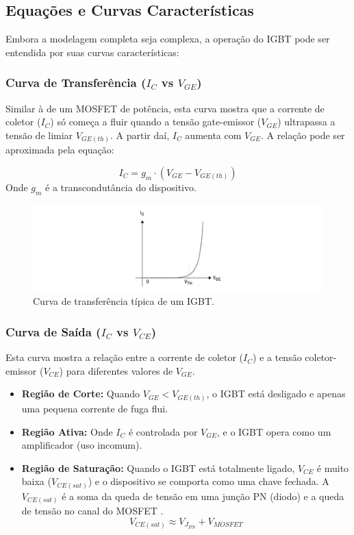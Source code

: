 \documentclass[12pt]{article}
\begin{document}
        \subsection{Equações e Curvas Características}

        Embora a modelagem completa seja complexa, a operação do IGBT pode ser entendida por suas curvas características:

        \subsubsection{Curva de Transferência ($I_C$ vs $V_{GE}$)}
        Similar à de um MOSFET de potência, esta curva mostra que a corrente de coletor ($I_C$) só começa a fluir quando a tensão gate-emissor ($V_{GE}$) ultrapassa a tensão de limiar $V_{GE(th)}$. A partir daí, $I_C$ aumenta com $V_{GE}$. A relação pode ser aproximada pela equação:

        \[
        I_C = g_m \cdot (V_{GE} - V_{GE(th)})
        \]
        Onde $g_m$ é a transcondutância do dispositivo.

        \begin{figure}[!h]
            \centering
            \includegraphics[width=0.6\linewidth]{images/curva_de_transferencia.png}
            \caption{Curva de transferência típica de um IGBT.}
            \label{fig:igbt_transfer}
        \end{figure}


        \subsubsection{\texorpdfstring{Curva de Saída ($I_C$ vs $V_{CE}$)}{Curva de Saída (IC vs VCE)}} Esta curva mostra a relação entre a corrente de coletor ($I_C$) e a tensão coletor-emissor ($V_{CE}$) para diferentes valores de $V_{GE}$.
        \begin{itemize}
            \item \textbf{Região de Corte:} Quando $V_{GE} < V_{GE(th)}$, o IGBT está desligado e apenas uma pequena corrente de fuga flui.
            \item \textbf{Região Ativa:} Onde $I_C$ é controlada por $V_{GE}$, e o IGBT opera como um amplificador (uso incomum).
            \item \textbf{Região de Saturação:} Quando o IGBT está totalmente ligado, $V_{CE}$ é muito baixa ($V_{CE(sat)}$) e o dispositivo se comporta como uma chave fechada. A $V_{CE(sat)}$ é a soma da queda de tensão em uma junção PN (diodo) e a queda de tensão no canal do MOSFET \cite{infineon_igbt_char}.
            \[
            V_{CE(sat)} \approx V_{J_{PN}} + V_{MOSFET}
            \]
        \end{itemize}
\end{document}
